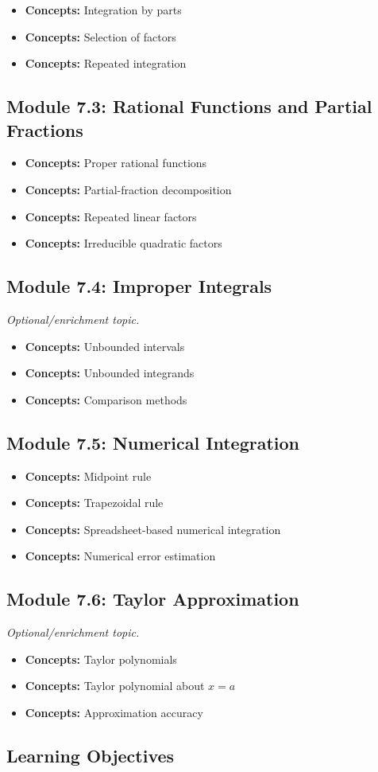 \documentclass[11pt]{article}
\newcommand{\concept}[1]{\item \textbf{Concepts:} #1}
\begin{document}
\begin{itemize}
    \concept{Integration by parts}
    \concept{Selection of factors}
    \concept{Repeated integration}
\end{itemize}

\subsection{Module 7.3: Rational Functions and Partial Fractions}

\begin{itemize}
    \concept{Proper rational functions}
    \concept{Partial-fraction decomposition}
    \concept{Repeated linear factors}
    \concept{Irreducible quadratic factors}
\end{itemize}

\subsection{Module 7.4: Improper Integrals}

\textit{Optional/enrichment topic.}

\begin{itemize}
    \concept{Unbounded intervals}
    \concept{Unbounded integrands}
    \concept{Comparison methods}
\end{itemize}

\subsection{Module 7.5: Numerical Integration}

\begin{itemize}
    \concept{Midpoint rule}
    \concept{Trapezoidal rule}
    \concept{Spreadsheet-based numerical integration}
    \concept{Numerical error estimation}
\end{itemize}

\subsection{Module 7.6: Taylor Approximation}

\textit{Optional/enrichment topic.}

\begin{itemize}
    \concept{Taylor polynomials}
    \concept{Taylor polynomial about $x=a$}
    \concept{Approximation accuracy}
\end{itemize}

\subsection{Learning Objectives}
\end{document}
